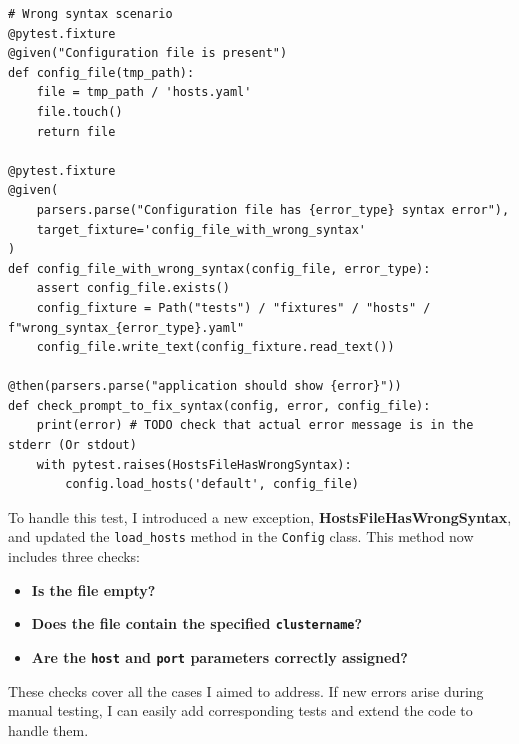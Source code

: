 \documentclass[10pt , a4paper]{report}
\newenvironment{code}{\captionsetup{type=listing}}{}
\begin{document}
\begin{code}
  \begin{verbatim}
# Wrong syntax scenario
@pytest.fixture
@given("Configuration file is present")
def config_file(tmp_path):
    file = tmp_path / 'hosts.yaml'
    file.touch()
    return file

@pytest.fixture
@given(
    parsers.parse("Configuration file has {error_type} syntax error"),
    target_fixture='config_file_with_wrong_syntax'
)
def config_file_with_wrong_syntax(config_file, error_type):
    assert config_file.exists()
    config_fixture = Path("tests") / "fixtures" / "hosts" / f"wrong_syntax_{error_type}.yaml"
    config_file.write_text(config_fixture.read_text())

@then(parsers.parse("application should show {error}"))
def check_prompt_to_fix_syntax(config, error, config_file):
    print(error) # TODO check that actual error message is in the stderr (Or stdout)
    with pytest.raises(HostsFileHasWrongSyntax):
        config.load_hosts('default', config_file)
  \end{verbatim}
\end{code}

To handle this test, I introduced a new exception, \textbf{HostsFileHasWrongSyntax}, and updated the \texttt{load\_hosts} method in the \texttt{Config} class. This method now includes three checks:

\begin{itemize}
    \item \textbf{Is the file empty?}
    \item \textbf{Does the file contain the specified \texttt{clustername}?}
    \item \textbf{Are the \texttt{host} and \texttt{port} parameters correctly assigned?}
\end{itemize}

These checks cover all the cases I aimed to address. If new errors arise during manual testing, I can easily add corresponding tests and extend the code to handle them.
\end{document}
